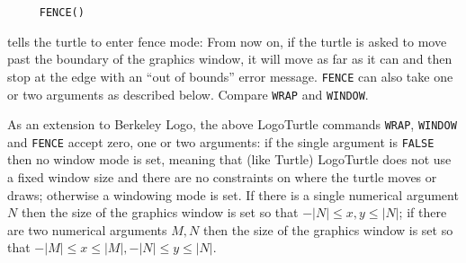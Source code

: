 \begin{verbatim}
     FENCE()
\end{verbatim}
tells the turtle to enter fence mode: From now on, if the turtle is
asked to move past the boundary of the graphics window, it will move
as far as it can and then stop at the edge with an ``out of bounds''
error message.  \texttt{FENCE} can also take one or two arguments as
described below.  Compare \texttt{WRAP} and \texttt{WINDOW}.

As an extension to Berkeley Logo, the above LogoTurtle commands
\texttt{WRAP}, \texttt{WINDOW} and \texttt{FENCE} accept zero, one or
two arguments: if the single argument is \texttt{FALSE} then no window
mode is set, meaning that (like Turtle) LogoTurtle does not use a
fixed window size and there are no constraints on where the turtle
moves or draws; otherwise a windowing mode is set.  If there is a
single numerical argument $N$ then the size of the graphics window is
set so that $-|N| \le x,y \le |N|$; if there are two numerical
arguments $M, N$ then the size of the graphics window is set so that
$-|M| \le x \le |M|, -|N| \le y \le |N|$.





